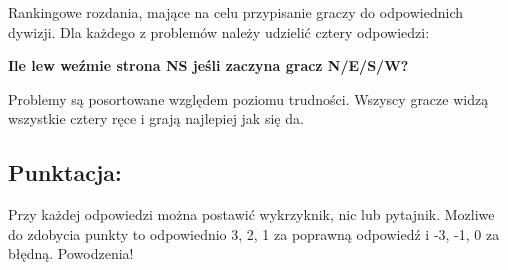 \documentclass{article}
\begin{document}
Rankingowe rozdania, mające na celu przypisanie graczy do odpowiednich dywizji. Dla każdego z problemów należy udzielić
cztery odpowiedzi:
\begin{center}
	\textbf{Ile lew weźmie strona NS jeśli zaczyna gracz N/E/S/W?}
\end{center}
Problemy są posortowane względem poziomu trudności. Wszyscy gracze widzą wszystkie cztery ręce i grają najlepiej jak
się da.
\subsection*{Punktacja:}%
Przy każdej odpowiedzi można postawić wykrzyknik, nic lub pytajnik. Mozliwe do zdobycia punkty to odpowiednio 3, 2, 1 za
poprawną odpowiedź i -3, -1, 0 za błędną. Powodzenia!
\begin{multicols}{2}
\begin{quote}
%
       {}%
       {}%
       {}%
       {}
\end{quote}

\begin{quote}
%
       {}%
       {}%
       {}%
       {}
\end{quote}

\begin{quote}
%
       {}%
       {}%
       {}%
       {}
\end{quote}
\vfill\null
\columnbreak

\begin{quote}
%
       {}%
       {}%
       {}%
       {}
\end{quote}

\begin{quote}
%
       {}%
       {}%
       {}%
       {}
\end{quote}

\begin{quote}
%
       {}%
       {}%
       {}%
       {}
\end{quote}
\end{multicols}
\end{document}

